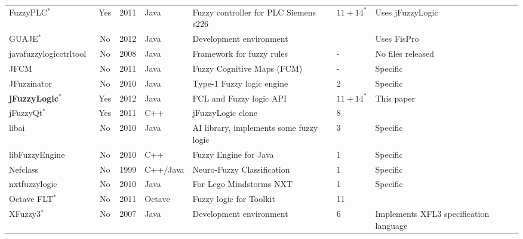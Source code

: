 \documentclass[11pt,twoside]{article}
\begin{document}
\begin{multicols}{2}
\begin{table}[ht]
{{{\begin{tabular}{@{}|@{\ }l|c|c|l|l|l|l@{\ }|@{}}
FuzzyPLC$^{\ast}$~\cite{FuzzyPLC2011}	&	Yes	&	2011	&	Java	&	Fuzzy controller for PLC Siemens s226	&	$11 + 14^*$	&	Uses jFuzzyLogic\\
GUAJE$^{\ast}$~\cite{Alonso2011} 		&	No	&	2012	&	Java	&	Development environment 	&		&	Uses FisPro\\
javafuzzylogicctrltool~\cite{javafuzzylogicctrltool2008}	&	No	&	2008	&	Java	&	Framework for fuzzy rules	&	-	&	No files released\\
JFCM~\cite{JFCM2011}			&	No	&	2011	&	Java	&	Fuzzy Cognitive Maps (FCM)	&	-	&	Specific\\
JFuzzinator~\cite{JFuzzinator2010}		&	No	&	2010	&	Java	&	Type-1 Fuzzy logic engine	&	2	&	Specific\\
\textbf{jFuzzyLogic}$^{\ast}$	&	Yes	&	2012 	&	Java	&	FCL and Fuzzy logic API	&	$11 + 14^*$	&	This paper \\
jFuzzyQt$^{\ast}$~\cite{jFuzzyQt2011}	&	Yes	&	2011 	&	C++	&	jFuzzyLogic clone 	&	8	&	\\
libai~\cite{libai2010}			&	No	&	2010 	&	Java 	&	AI library, implements some fuzzy logic 	&	3	&	Specific\\
libFuzzyEngine~\cite{libFuzzyEngine2010}		&	No	&	2010	&	C++	&	Fuzzy Engine for Java	&	1	&	Specific\\
Nefclass~\cite{Nauck1995}			&	No	&	1999	&	C++/Java	&	Neuro-Fuzzy Classification	&	1	&	Specific\\
nxtfuzzylogic~\cite{nxtfuzzylogic2010}		&	No	&	2010	&	Java	&	For Lego Mindstorms NXT	&	1	&	Specific\\
Octave FLT$^{\ast}$~\cite{OctaveFLT2011}	&	No	&	2011	&	Octave	&	Fuzzy logic for Toolkit	&	11	&	\\
XFuzzy3$^{\ast}$~\cite{Baturone2007}	&	No	&	2007	&	Java	&	Development environment	&	6	&	Implements XFL3 specification language\\\hline
\end{tabular}}}}
\end{table}


\end{multicols}
\end{document}
